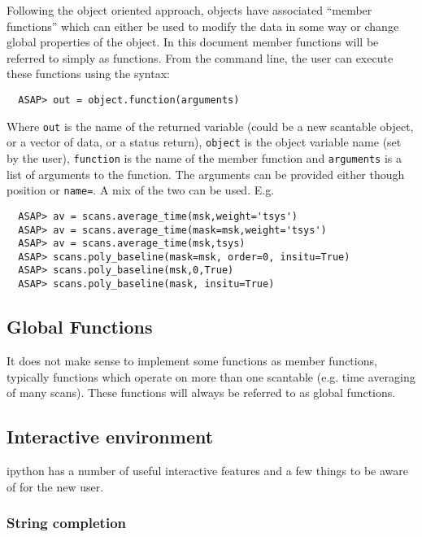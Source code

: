 \documentclass[11pt]{article}
\newcommand{\cmd}[1]{{\tt #1}}
\begin{document}
Following the object oriented approach,
objects have associated ``member functions'' which can either be used
to modify the data in some way or change global properties of the
object. In this document member functions will be referred to simply
as functions. From the command line, the user can execute these
functions using the syntax:
\begin{verbatim}
  ASAP> out = object.function(arguments)
\end{verbatim}

Where \cmd{out} is the name of the returned variable (could be a new
scantable object, or a vector of data, or a status return),
\cmd{object} is the object variable name (set by the user),
\cmd{function} is the name of the member function and \cmd{arguments}
is a list of arguments to the function. The arguments can be provided
either though position or \cmd{name=}.  A mix of the two can be used.
E.g.

\begin{verbatim}
  ASAP> av = scans.average_time(msk,weight='tsys')
  ASAP> av = scans.average_time(mask=msk,weight='tsys')
  ASAP> av = scans.average_time(msk,tsys)
  ASAP> scans.poly_baseline(mask=msk, order=0, insitu=True)
  ASAP> scans.poly_baseline(msk,0,True)
  ASAP> scans.poly_baseline(mask, insitu=True)
\end{verbatim}

\subsection{Global Functions}

It does not make sense to implement some functions as member
functions, typically functions which operate on more than one
scantable (e.g. time averaging of many scans). These functions will
always be referred to as global functions.

\subsection{Interactive environment}

ipython has a number of useful interactive
features and a few things to be aware of for the new user.

\subsubsection{String completion}
\end{document}
